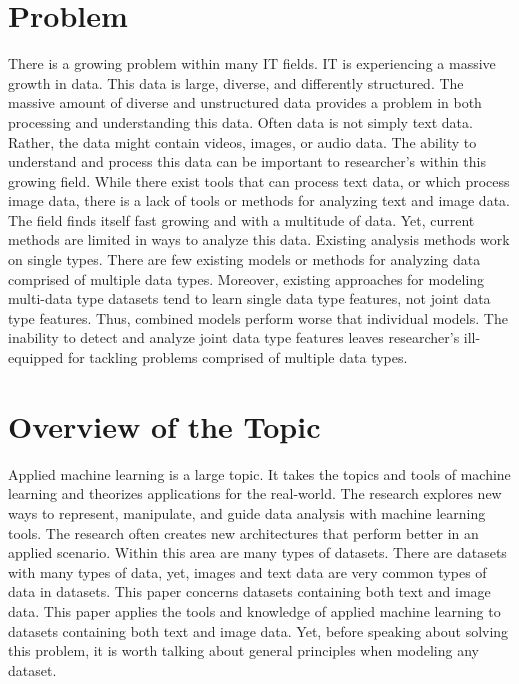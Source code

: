 
\chapter{Problem}
There is a growing problem within many IT fields.  IT is experiencing a massive growth in data.  This data is large, diverse, and differently structured.  The massive amount of diverse and unstructured data provides a problem in both processing and understanding this data.  Often data is not simply text data.  Rather, the data might contain videos, images, or audio data.  The ability to understand and process this data can be important to researcher's within this growing field.  While there exist tools that can process text data, or which process image data, there is a lack of tools or methods for analyzing text and image data.  The field finds itself fast growing and with a multitude of data.  Yet, current methods are limited in ways to analyze this data.  Existing analysis methods work on single types.  There are few existing models or methods for analyzing data comprised of multiple data types.  Moreover, existing approaches for modeling multi-data type datasets tend to learn single data type features, not joint data type features.  Thus, combined models perform worse that individual models.  The inability to detect and analyze joint data type features leaves researcher's ill-equipped for tackling problems comprised of multiple data types.


\chapter{Overview of the Topic}
Applied machine learning is a large topic.  It takes the topics and tools of machine learning and theorizes applications for the real-world.  The research explores new ways to represent, manipulate, and guide data analysis with machine learning tools.  The research often creates new architectures that perform better in an applied scenario.  Within this area are many types of datasets.  There are datasets with many types of data, yet, images and text data are very common types of data in datasets.  This paper concerns datasets containing both text and image data.  This paper applies the tools and knowledge of applied machine learning to datasets containing both text and image data.  Yet, before speaking about solving this problem, it is worth talking about general principles when modeling any dataset.  

